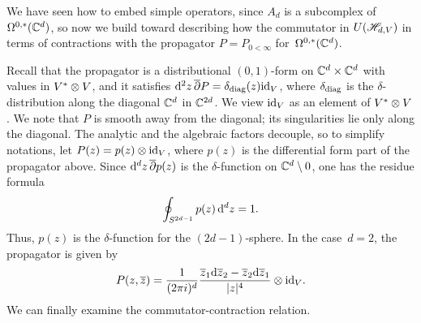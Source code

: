 We have seen how to embed simple operators,
since $A_d$ is a subcomplex of $\Omega^{0,*}(\mathbb C^d)$,
so now we build toward describing how the commutator in $U(\mathscr H_{d,V})$ in terms of contractions with the propagator $P = P_{0 < \infty}$ for~$\Omega^{0,*}(\mathbb C^d)$. 

Recall that the propagator is a distributional $(0,1)$-form on $\mathbb C^d \times \mathbb C^d$ with values in $V^* \otimes V$, 
and it satisfies ${\rm d}^2 z\, \overline{\partial} P = \delta_{{\rm diag}} (z) {\rm id}_V$, where $\delta_{{\rm diag}}$ is the $\delta$-distribution along the diagonal $\mathbb C^d$ in $\mathbb C^{2d}$. 
We view ${\rm id}_V$ as an element of $V^* \otimes V$. 
We note that $P$ is smooth away from the diagonal; 
its singularities lie only along the diagonal.
The analytic and the algebraic factors decouple, 
so to simplify notations, let $P(z) = p(z) \otimes {\rm id}_V$, 
where $p(z)$ is the differential form part of the propagator above. 
Since ${\rm d}^d z \, \overline{\partial} p(z)$ is the $\delta$-function on $\mathbb C^d \setminus 0$,
one has the residue formula
\[
\oint_{S^{2d-1}} p(z) \,{\rm d}^d z = 1 .
\]
Thus, $p(z)$ is the $\delta$-function for the $(2d-1)$-sphere.
In the case~$d=2$,
the propagator is given by
\[
P (z,\overline{z}) = \frac{1}{(2\pi i)^d} \frac{\overline{z}_1 {\rm d} \overline{z}_2 - \overline{z}_2 {\rm d} \overline{z}_1}{|z|^4} \otimes {\rm id}_{V}.
\]
We can finally examine the commutator-contraction relation.


